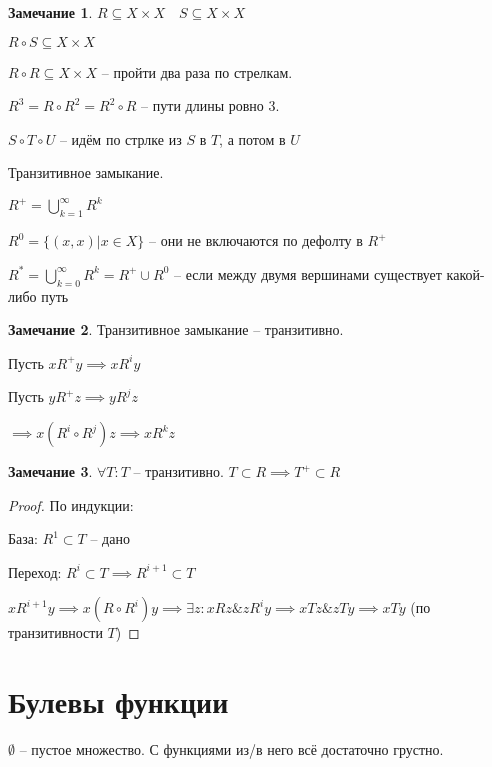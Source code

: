 \documentclass{book}
\renewcommand\O{\ensuremath{\emptyset}}
\theoremstyle{definition}
\newtheorem*{note}{Замечание}
\begin{document}
    \begin{note}
        $R\subseteq X\times X\quad S\subseteq X\times X$

        $R\circ S \subseteq X\times X$
        
        $R\circ R\subseteq X\times X$ -- пройти два раза по стрелкам.

        $R^3 = R\circ R^2 = R^2\circ R$ -- пути длины ровно 3.

        $S\circ T\circ U$ -- идём по стрлке из $S$ в $T$, а потом в $U$
    \end{note}

    \begin{definition}
        Транзитивное замыкание.

        $R^+ = \bigcup\limits_{k=1}^{\infty } R^k$

        $R^0 = \{(x,x)|x\in X\}$ -- они не включаются по дефолту в $R^+$

        $R^* = \bigcup\limits_{k=0} ^{\infty } R^k = R^+ \cup R^0$ -- если между двумя вершинами существует какой-либо путь
    \end{definition}
    \begin{note}
        Транзитивное замыкание -- транзитивно.

        Пусть $xR^+y \implies x R^i y$

        Пусть $yR^+z \implies yR^j z$

        $\implies x(R^i\circ R^j)z \implies  xR^k z$
    \end{note}
    \begin{note}
        $\forall T:T$ -- транзитивно. $T\subset R \implies T^+ \subset R$
    \end{note}
    \begin{proof}
        По индукции:

        База: $R^1 \subset T$ -- дано

        Переход: $R^i\subset T \implies  R^{i+1}\subset T$

        $xR^{i+1}y \implies x(R\circ R^i)y\implies \exists z: xRz\&zR^iy \implies xTz\&zTy \implies xTy$ (по транзитивности $T$)
    \end{proof}

    \section{Булевы функции}

    $\O $ -- пустое множество. С функциями из/в него всё достаточно грустно.
\end{document}
